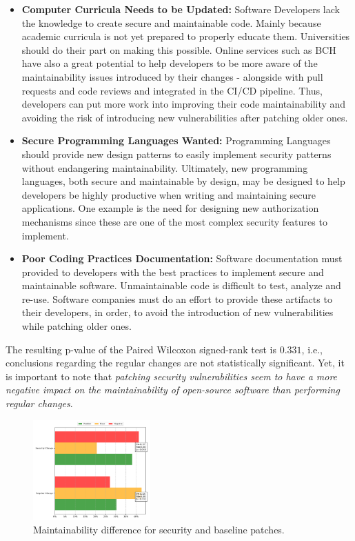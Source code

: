 \documentclass[10pt,conference]{IEEEtran}
\begin{document}
\begin{itemize}

	\item\textbf{Computer Curricula Needs to be Updated:}
	Software Developers lack the knowledge to create secure and
	maintainable code. Mainly because academic curricula is not yet prepared
	to properly educate them. Universities should do their part on making
	this possible. Online services such as BCH have also a great potential to help
	developers to be more aware of the maintainability issues introduced by their
	changes - alongside with pull requests and code reviews and integrated in 
	the CI/CD pipeline. Thus, developers can 
	put more work into improving their code maintainability and avoiding the risk
	of introducing new vulnerabilities after patching older ones.
	
	\item\textbf{Secure Programming Languages Wanted:} Programming Languages 
	should provide new design patterns to easily implement security patterns 
	without endangering maintainability.
	Ultimately, new programming languages, both secure and maintainable by design,
	may be designed to help developers be highly productive when writing and
	maintaining secure applications. One example is the need for designing new
	authorization mechanisms since these are one of the most complex security
	features to implement.
	
	\item\textbf{Poor Coding Practices Documentation:} 
	Software documentation must provided to developers with the
	best practices to implement secure and maintainable software. Unmaintainable
	code is difficult to test, analyze and re-use. Software companies must
	do an effort to provide these artifacts to their developers, in order,
	to avoid the introduction of new vulnerabilities while patching older ones.
	
\end{itemize}

The resulting p-value of the Paired Wilcoxon signed-rank test is $0.331$, i.e., 
conclusions regarding the regular changes are not statistically significant. 
Yet, it is important to note that \emph{patching security vulnerabilities seem 
to have a more negative impact on the maintainability of open-source software 
than performing regular changes}.

\begin{figure}[h]	
 	\centering 	\includegraphics[width=0.4\textwidth]{figures/main_comparison.pdf}
 	\caption{Maintainability difference for security and baseline patches.}
	\label{fig:secvsreg}
\end{figure}
\end{document}
